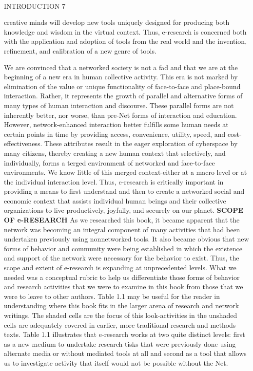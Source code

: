 ‎\documentclass[a4paper,12pt]{book}‎
\begin{document}
\begin{flushright}
INTRODUCTION
\hspace{6mm}
7
\end{flushright} 
\vspace{3mm}
creative minds will develop new tools uniquely designed for producing both knowledge and wisdom in the virtual context. Thus, e-research is concerned both with the application and adoption of tools from the real world and the invention, refinement, and calibration of a new genre of tools.

We are convinced that a networked society is not a fad and that we are at the beginning of a new era in human collective activity. This era is not marked by elimination of the value or unique functionality of face-to-face and place-bound interaction. Rather, it represents the growth of parallel and alternative forms of many types of human interaction and discourse. These parallel forms are not inherently better, nor worse, than pre-Net forms of interaction and education. However, network-enhanced interaction better fulfills some human needs at certain points in time by providing access, convenience, utility, speed, and cost-effectiveness. These attributes result in the eager exploration of cyberspace by many citizens, thereby creating a new human context that selectively, and individually, forms a terged environment of networked and face-to-face environments. We know little of this merged context-either at a macro level or at the individual interaction level. Thus, e-research is critically important in providing a means to first understand and then to create a networked social and economic context that assists individual human beings and their collective organizations to live productively, joyfully, and securely on our planet.
\vspace{3mm}
\hspace{-2.5cm}
\textbf{SCOPE OF e-RESEARCH}
\vspace{2mm}
As we researched this book, it became apparent that the network was becoming an integral component of many activities that had been undertaken previously using nonnetworked tools. It also became obvious that new forms of behavior and community were being established in which the existence and support of the network were necessary for the behavior to exist. Thus, the scope and extent of e-research is expanding at unprecedented levels. What we needed was a conceptual rubric to help us differentiate those forms of behavior and research activities that we were to examine in this book from those that we were to leave to other authors. Table 1.1 may be useful for the reader in understanding where this book fits in the larger arena of research and network writings. The shaded cells are the focus of this look-activities in the unshaded cells are adequately covered in earlier, more traditional research and methods texts. Table 1.1 illustrates that e-research works at two quite distinct levels: first as a new medium to undertake research tisks that were previously done using alternate media or without mediated tools at all and second as a tool that allows us to investigate activity that itself would not be possible without the Net.
\end{document}
